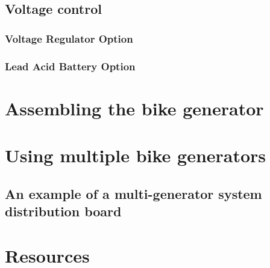 \documentclass{article}
\theoremstyle{definition}
\theoremstyle{definition}
\theoremstyle{remark}
\begin{document}

  \subsection{Voltage control} %
  \label{sub:voltage_control}

    \subsubsection{Voltage Regulator Option} %
    \label{ssub:voltage_regulator_option}
    

    \subsubsection{Lead Acid Battery Option} %
    \label{ssub:lead_acid_battery_option}
    



\section{Assembling the bike generator} %
\label{sec:assembling_the_bike_generator}


\section{Using multiple bike generators} %
\label{sec:using_multiple_bike_generators}

  \subsection{An example of a multi-generator system distribution board} %
  \label{sub:an_example_of_a_multi_generator_system_distribution_board}
  


\section{Resources} %
\label{sec:resources}
\end{document}
